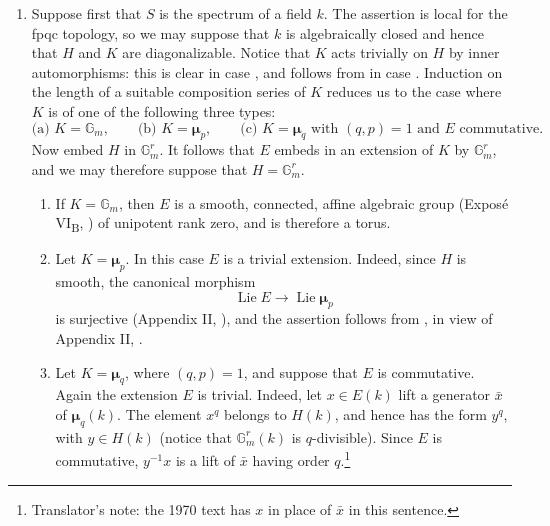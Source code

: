 \begin{enumerate}
\item[\SGAInlineRefTarget{sga3:xvii:proposition:7:1:1:item:i}(i)] Suppose first that \(S\) is the spectrum of a field
  \(k\).  The assertion is local for the fpqc topology, so we may
  suppose that \(k\) is algebraically closed and hence that \(H\)
  and \(K\) are diagonalizable.  Notice that \(K\) acts trivially
  on \(H\) by inner automorphisms: this is clear in case , and
  follows from  in case .  Induction on the length of a
  suitable composition series of \(K\) reduces us to the case
  where \(K\) is of one of the following three types:
  \[
    \text{(a) }K=\mathbb G_m,\qquad
    \text{(b) }K=\boldsymbol\mu_p,\qquad
    \text{(c) }K=\boldsymbol\mu_q\text{ with }(q,p)=1\text{ and }E\text{ commutative}.
  \]
  Now embed \(H\) in
  \(\mathbb G_m^r\).  It follows that \(E\) embeds in an extension
  of \(K\) by \(\mathbb G_m^r\), and we may therefore suppose that
  \(H=\mathbb G_m^r\).

  \begin{enumerate}
  \item[(a)] If \(K=\mathbb G_m\), then \(E\) is a smooth,
    connected, affine algebraic group (Exposé VI\textsubscript{B},
    ) of unipotent rank zero, and is therefore a torus.

  \item[(b)] Let \(K=\boldsymbol\mu_p\).  In this case \(E\) is a
    trivial extension.  Indeed, since \(H\) is smooth, the
    canonical morphism
    \[
      \operatorname{Lie}E\longrightarrow
      \operatorname{Lie}\boldsymbol\mu_p
    \]
    is surjective (Appendix II, ), and the assertion follows
    from , in view of Appendix II, .

  \item[\SGAInlineRefTarget{sga3:xvii:proposition:7:1:1:item:c}(c)] Let \(K=\boldsymbol\mu_q\), where \((q,p)=1\), and
    suppose that \(E\) is commutative.  Again the extension \(E\)
    is trivial.  Indeed, let \(x\in E(k)\) lift a generator
    \(\bar x\) of \(\boldsymbol\mu_q(k)\).  The element
    \(x^q\) belongs to \(H(k)\), and hence has the form
    \(y^q\), with \(y\in H(k)\) (notice that
    \(\mathbb G_m^r(k)\) is \(q\)-divisible).  Since \(E\)
    is commutative, \(y^{-1}x\) is a lift of \(\bar x\) having
    order \(q\).\footnote{Translator's note: the 1970 text has \(x\) in
    place of \(\bar x\) in this sentence.}
  \end{enumerate}


\end{enumerate}
